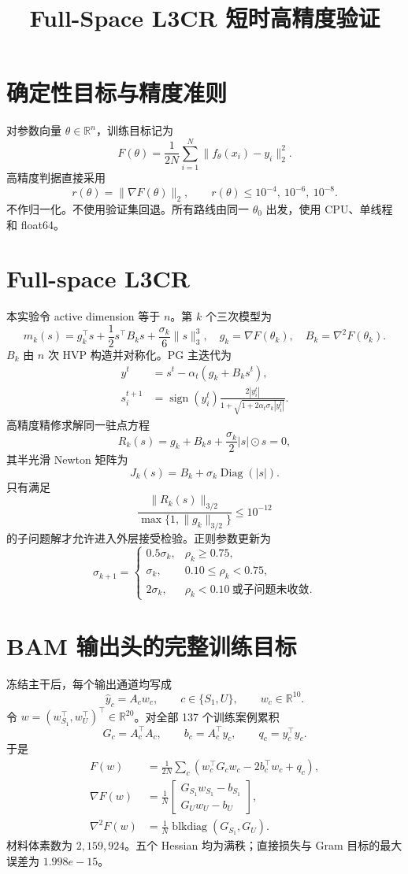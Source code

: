 \documentclass[UTF8,11pt,fontset=none]{ctexart}
\title{Full-Space L3CR 短时高精度验证}
\author{}
\date{}
\begin{document}
\maketitle

\section{确定性目标与精度准则}
对参数向量 $\theta\in\mathbb R^n$，训练目标记为
\[
F(\theta)=\frac1{2N}\sum_{i=1}^N
\lVert f_\theta(x_i)-y_i\rVert_2^2.
\]
高精度判据直接采用
\[
r(\theta)=\lVert\nabla F(\theta)\rVert_2,
\qquad
r(\theta)\le10^{-4},\ 10^{-6},\ 10^{-8}.
\]
不作归一化。不使用验证集回退。所有路线由同一 $\theta_0$ 出发，使用 CPU、单线程和 float64。

\section{Full-space L3CR}
本实验令 active dimension 等于 $n$。第 $k$ 个三次模型为
\begin{equation}
m_k(s)=g_k^\top s+\frac12s^\top B_ks+
\frac{\sigma_k}6\lVert s\rVert_3^3,
\quad
g_k=\nabla F(\theta_k),
\quad
B_k=\nabla^2F(\theta_k).
\end{equation}
$B_k$ 由 $n$ 次 HVP 构造并对称化。PG 主迭代为
\begin{align}
y^t&=s^t-\alpha_t(g_k+B_ks^t),\\
s_i^{t+1}&=\operatorname{sign}(y_i^t)
\frac{2|y_i^t|}
{1+\sqrt{1+2\alpha_t\sigma_k|y_i^t|}}.
\end{align}
高精度精修求解同一驻点方程
\[
R_k(s)=g_k+B_ks+\frac{\sigma_k}2|s|\odot s=0,
\]
其半光滑 Newton 矩阵为
\[
J_k(s)=B_k+\sigma_k\operatorname{Diag}(|s|).
\]
只有满足
\[
\frac{\lVert R_k(s)\rVert_{3/2}}
{\max\{1,\lVert g_k\rVert_{3/2}\}}
\le10^{-12}
\]
的子问题解才允许进入外层接受检验。正则参数更新为
\[
\sigma_{k+1}=
\begin{cases}
0.5\sigma_k,&\rho_k\ge0.75,\\
\sigma_k,&0.10\le\rho_k<0.75,\\
2\sigma_k,&\rho_k<0.10\ \text{或子问题未收敛}.
\end{cases}
\]

\section{BAM 输出头的完整训练目标}
冻结主干后，每个输出通道均写成
\[
\widehat y_c=A_cw_c,
\qquad c\in\{S_1,U\},
\qquad w_c\in\mathbb R^{10}.
\]
令 $w=(w_{S_1}^\top,w_U^\top)^\top\in\mathbb R^{20}$。对全部 137 个训练案例累积
\[
G_c=A_c^\top A_c,
\qquad b_c=A_c^\top y_c,
\qquad q_c=y_c^\top y_c.
\]
于是
\begin{align}
F(w)
&=\frac1{2N}\sum_c
\left(w_c^\top G_cw_c-2b_c^\top w_c+q_c\right),\\
\nabla F(w)
&=\frac1N
\begin{bmatrix}G_{S_1}w_{S_1}-b_{S_1}\\G_Uw_U-b_U\end{bmatrix},\\
\nabla^2F(w)
&=\frac1N\operatorname{blkdiag}(G_{S_1},G_U).
\end{align}
材料体素数为 $2,159,924$。五个 Hessian 均为满秩；直接损失与 Gram 目标的最大误差为 $1.998e-15$。
\end{document}
